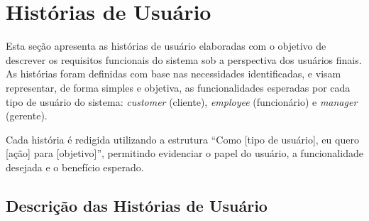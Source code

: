 \section{Histórias de Usuário}

Esta seção apresenta as histórias de usuário elaboradas com o objetivo de descrever os requisitos funcionais do sistema sob a perspectiva dos usuários finais. As histórias foram definidas com base nas necessidades identificadas, e visam representar, de forma simples e objetiva, as funcionalidades esperadas por cada tipo de usuário do sistema: \textit{customer} (cliente), \textit{employee} (funcionário) e \textit{manager} (gerente). 

Cada história é redigida utilizando a estrutura “Como [tipo de usuário], eu quero [ação] para [objetivo]”, permitindo evidenciar o papel do usuário, a funcionalidade desejada e o benefício esperado.

\subsection{Descrição das Histórias de Usuário}